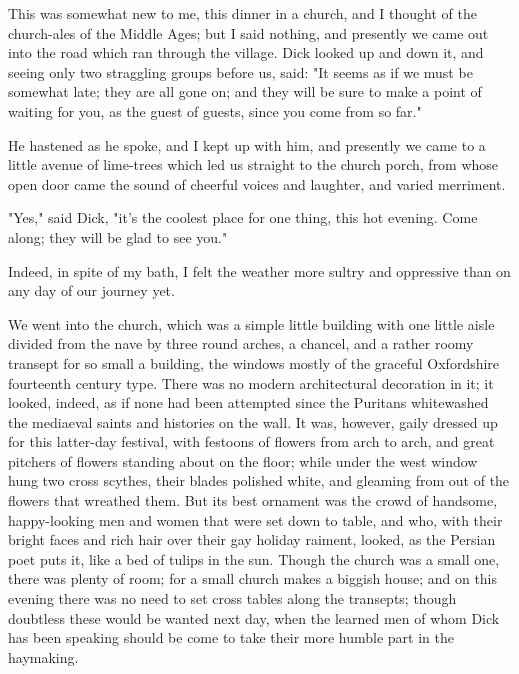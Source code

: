 This was somewhat new to me, this dinner in a church, and I thought of
the church-ales of the Middle Ages; but I said nothing, and presently we
came out into the road which ran through the village. Dick looked up and
down it, and seeing only two straggling groups before us, said: "It
seems as if we must be somewhat late; they are all gone on; and they
will be sure to make a point of waiting for you, as the guest of guests,
since you come from so far."

He hastened as he spoke, and I kept up with him, and presently we came
to a little avenue of lime-trees which led us straight to the church
porch, from whose open door came the sound of cheerful voices and
laughter, and varied merriment.

"Yes," said Dick, "it's the coolest place for one thing, this hot
evening. Come along; they will be glad to see you."

Indeed, in spite of my bath, I felt the weather more sultry and
oppressive than on any day of our journey yet.

We went into the church, which was a simple little building with one
little aisle divided from the nave by three round arches, a chancel, and
a rather roomy transept for so small a building, the windows mostly of
the graceful Oxfordshire fourteenth century type. There was no modern
architectural decoration in it; it looked, indeed, as if none had been
attempted since the Puritans whitewashed the mediaeval saints and
histories on the wall. It was, however, gaily dressed up for this
latter-day festival, with festoons of flowers from arch to arch, and
great pitchers of flowers standing about on the floor; while under the
west window hung two cross scythes, their blades polished white, and
gleaming from out of the flowers that wreathed them. But its best
ornament was the crowd of handsome, happy-looking men and women that
were set down to table, and who, with their bright faces and rich hair
over their gay holiday raiment, looked, as the Persian poet puts it,
like a bed of tulips in the sun. Though the church was a small one,
there was plenty of room; for a small church makes a biggish house; and
on this evening there was no need to set cross tables along the
transepts; though doubtless these would be wanted next day, when the
learned men of whom Dick has been speaking should be come to take their
more humble part in the haymaking.

